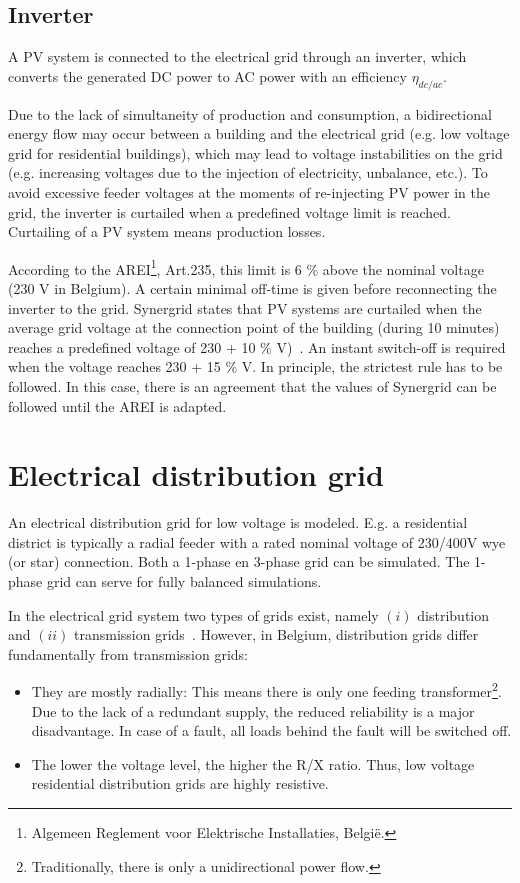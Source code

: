 \subsection{Inverter}
A PV system is connected to the electrical grid through an inverter, which converts the generated DC power to AC power with an efficiency $\eta_{dc/ac}$.

Due to the lack of simultaneity of production and consumption, a bidirectional energy flow may occur between a building and the electrical grid (e.g. low voltage grid for residential buildings), which may lead to voltage instabilities on the grid (e.g. increasing voltages due to the injection of electricity, unbalance, etc.). To avoid excessive feeder voltages at the moments of re-injecting PV power in the grid, the inverter is curtailed when a predefined voltage limit is reached. Curtailing of a PV system means production losses.

According to the AREI\footnote{Algemeen Reglement voor Elektrische Installaties, Belgi\"e.}, Art.235, this limit is 6 \% above the nominal voltage (230 V in Belgium). A certain minimal off-time is given before reconnecting the inverter to the grid. Synergrid states that PV systems are curtailed when the average grid voltage at the connection point of the building (during 10 minutes) reaches a predefined voltage of 230 + 10 \% V)~\cite{synergrid}. An instant switch-off is required when the voltage reaches 230 + 15 \% V. In principle, the strictest rule has to be followed. In this case, there is an agreement that the values of Synergrid can be followed until the AREI is adapted.

\section{Electrical distribution grid}
An electrical distribution grid for low voltage is modeled. E.g. a residential district is typically a radial feeder with a rated nominal voltage of 230/400V wye (or star) connection. Both a 1-phase en 3-phase grid can be simulated. The 1-phase grid can serve for fully balanced simulations.

In the electrical grid system two types of grids exist, namely $(i)$ distribution and $(ii)$ transmission grids~\cite{ehaesen,willis}. However, in Belgium, distribution grids differ fundamentally from transmission grids:

\begin{itemize}
\item They are mostly radially: This means there is only one feeding transformer\footnote{Traditionally, there is only a unidirectional power flow.}. Due to the lack of a redundant supply, the reduced reliability is a major disadvantage. In case of a fault, all loads behind the fault will be switched off.
\item The lower the voltage level, the higher the R/X ratio. Thus, low voltage residential distribution grids are highly resistive.
\end{itemize}

